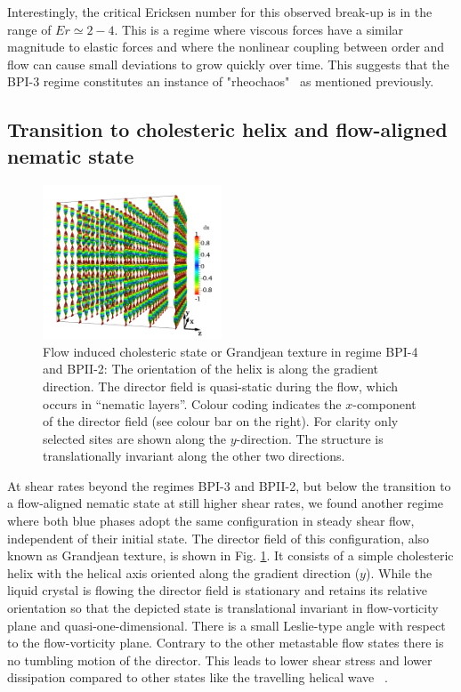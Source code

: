 \documentclass[8.5pt,twoside,twocolumn]{article}
\begin{document}
Interestingly, the critical Ericksen number for this observed break-up is in 
the range of $Er\simeq 2-4$. This is a regime where viscous forces have a 
similar magnitude to elastic forces and where the nonlinear coupling between
order and flow can cause small deviations to grow quickly over time. 
This suggests that the BPI-3 regime constitutes an instance 
of "rheochaos"~\cite{rheochaos,Cates:2002} as mentioned previously.

\subsection{Transition to cholesteric helix and flow-aligned nematic state}\label{gj-fan}

\begin{figure}[htpb]
\includegraphics[width=0.475\textwidth]{dir3d+y-200k_run1179r.png}
\caption{Flow induced cholesteric state or Grandjean texture in regime BPI-4 and BPII-2: 
The orientation of the helix is along the gradient direction. 
The director field is quasi-static during the flow, which occurs 
in ``nematic layers''. Colour coding indicates the 
$x$-component of the director field (see colour bar on the right).
For clarity only selected sites are shown along the $y$-direction.
The structure is translationally invariant along the other two directions.}
\label{grandjean}
\end{figure}

At shear rates beyond the regimes BPI-3 and BPII-2, but below the transition to a 
flow-aligned nematic state at still higher shear rates, we found another regime where 
both blue phases adopt the same configuration in steady shear flow, 
independent of their initial state.
The director field of this configuration, also known as
Grandjean texture, is shown in Fig. \ref{grandjean}.
It consists of a simple cholesteric helix with the helical axis oriented 
along the gradient direction ($y$). While the liquid crystal is flowing 
the director field is stationary and 
retains its relative orientation so that the depicted state is translational invariant 
in flow-vorticity plane and quasi-one-dimensional. 
There is a small Leslie-type angle with respect to 
the flow-vorticity plane. 
Contrary to the other metastable flow states there is no tumbling motion 
of the director. This leads to lower shear stress and lower dissipation 
compared to other states like the travelling helical wave ~\cite{Rey:1996a, Rey:1996b}.
\end{document}
